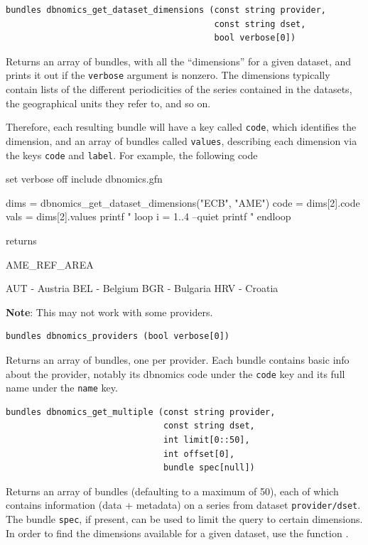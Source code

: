 \documentclass{article}
\begin{document}
\begin{funcdoc}
\begin{verbatim}
bundles dbnomics_get_dataset_dimensions (const string provider,
                                         const string dset,
                                         bool verbose[0])
\end{verbatim}
Returns an array of bundles, with all the ``dimensions'' for a given
dataset, and prints it out if the \texttt{verbose} argument is
nonzero. The dimensions typically contain lists of the different
periodicities of the series contained in the datasets, the
geographical units they refer to, and so on.

Therefore, each resulting bundle will have a key called \texttt{code},
which identifies the dimension, and an array of bundles called
\texttt{values}, describing each dimension via the keys \texttt{code}
and \texttt{label}. For example, the following code
\begin{code}
set verbose off
include dbnomics.gfn

dims = dbnomics_get_dataset_dimensions("ECB", "AME")
code = dims[2].code
vals = dims[2].values
printf "%
loop i = 1..4 --quiet
    printf "%
endloop
\end{code}

returns

\begin{code}
AME_REF_AREA

AUT - Austria
BEL - Belgium
BGR - Bulgaria
HRV - Croatia
\end{code}

\textbf{Note}: This may not work with some providers.
\end{funcdoc}

\begin{funcdoc}
\begin{verbatim}
bundles dbnomics_providers (bool verbose[0])
\end{verbatim}
Returns an array of bundles, one per provider. Each bundle contains
basic info about the provider, notably its dbnomics code under the
\texttt{code} key and its full name under the \texttt{name} key.
\end{funcdoc}

\begin{funcdoc}
\begin{verbatim}
bundles dbnomics_get_multiple (const string provider,
                               const string dset,
                               int limit[0::50],
                               int offset[0],
                               bundle spec[null])
\end{verbatim}
  Returns an array of bundles (defaulting to a maximum of 50), each of
  which contains information (data + metadata) on a series from
  dataset \texttt{provider/dset}. The bundle \texttt{spec}, if
  present, can be used to limit the query to certain dimensions. In
  order to find the dimensions available for a given dataset, use the
  function .
\end{funcdoc}
\end{document}
